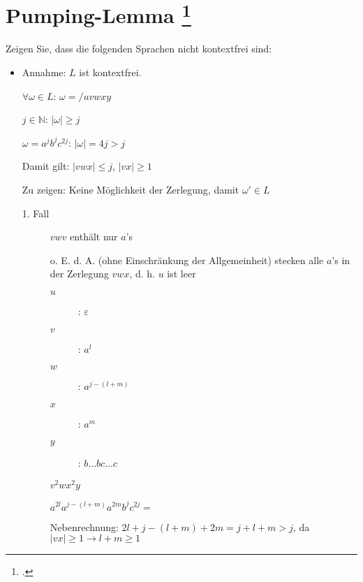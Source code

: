 \documentclass{lehramt-informatik-aufgabe}
\begin{document}
\def\A{$a$’s }
\def\B{$b$’s }

\section{Pumping-Lemma
\footcite[Seite 43]{theo:fs:2}}

Zeigen Sie, dass die folgenden Sprachen nicht kontextfrei sind:

\begin{itemize}

%

\item {}

\begin{liAntwort}
Annahme: $L$ ist kontextfrei.

$\forall \omega \in L$: $\omega = / uvwxy$

$j \in \mathbb{N}$: $|\omega| \geq j$

$\omega = a^j b^j c^{2j}$: $|\omega| = 4j > j$

Damit gilt: $|vwx| \leq j$, $|vx| \geq 1$

Zu zeigen: Keine Möglichkeit der Zerlegung, damit $\omega' \in L$

\begin{description}

%

\item[1. Fall]

$vwv$ enthält nur $a$'s

o. E. d. A. (ohne Einschränkung der Allgemeinheit) stecken alle $a$'s in
der Zerlegung $vwx$, d. h. $u$ ist leer

\begin{description}
\item[$u$]: $\varepsilon$
\item[$v$]: $a^l$
\item[$w$]: $a^{j-(l+m)}$
\item[$x$]: $a^m$
\item[$y$]: $b\dots b c \dots c$
\end{description}

$v^2 w x^2 y$

$a^{2l} a^{j-(l+m)} a^{2m} b^j c^{2j} =   $

Nebenrechnung: $2l + j - (l + m) + 2m = j + l + m > j$,
da $|vx| \geq 1 \rightarrow l + m \geq 1$


\end{description}
\end{liAntwort}
\end{itemize}
\end{document}
